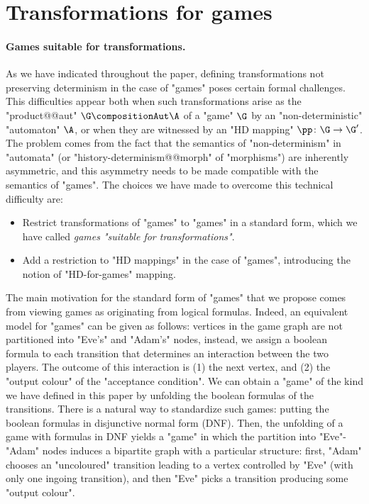 \documentclass[10pt,a4paper]{amsart}
\begin{document}
 	

	\section{Transformations for games}
	\label{sec:appendix-games-transformations}
	\paragraph*{Games suitable for transformations.}
As we have indicated throughout the paper, defining transformations not preserving determinism in the case of "games" poses certain formal challenges. This difficulties appear both when  such transformations arise as the "product@@aut" $\G \compositionAut \A$ of a "game" $\G$ by an "non-deterministic" "automaton" $\A$, or when they are witnessed by an "HD mapping" $\pp\colon \G \to \G'$. The problem comes from the fact that the semantics of "non-determinism" in "automata" (or "history-determinism@@morph" of "morphisms") are inherently asymmetric,  and this asymmetry needs to be made compatible with the semantics of "games". 
The choices we have made to overcome this technical difficulty are:
\begin{itemize}
	\item Restrict transformations of "games" to "games" in a standard form, which we have called \emph{games "suitable for transformations"}.
	\item Add a restriction to "HD mappings" in the case of "games", introducing the notion of "HD-for-games" mapping. 
\end{itemize}

The main motivation for the standard form of "games" that we propose comes from viewing games as originating from logical formulas. Indeed, an equivalent model for "games" can be given as follows: vertices in the game graph are not partitioned into "Eve's" and "Adam's" nodes, instead, we assign a boolean formula to each transition that determines an interaction between the two players. The outcome of this interaction is (1) the next vertex, and (2) the "output colour" of the "acceptance condition". We can obtain a "game" of the kind we have defined in this paper by unfolding the boolean formulas of the transitions. There is a natural way to standardize such games: putting the boolean formulas in disjunctive normal form (DNF). Then, the unfolding of a game with formulas in DNF yields a "game" in which the partition into "Eve"-"Adam" nodes induces a bipartite graph with a particular structure: first, "Adam" chooses an "uncoloured" transition leading to a vertex controlled by "Eve" (with only one ingoing transition), and then "Eve" picks a transition producing some "output colour".
\end{document}
